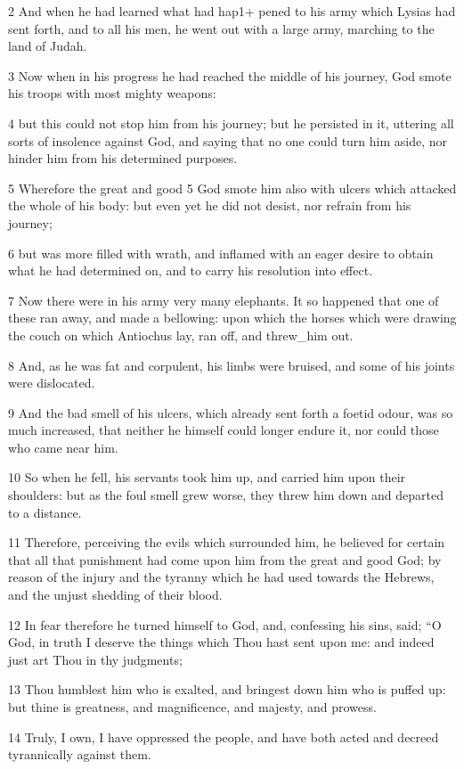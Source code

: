 2 And when he had learned what had hap1+ pened to his army which Lysias had sent forth, and to all his men, he went out with a large army, marching to the land of Judah. 

3 Now when in his progress he had reached the middle of his journey, God smote his troops with most mighty weapons: 

4 but this could not stop him from his journey; but he persisted in it, uttering all sorts of insolence against God, and saying that no one could turn him aside, nor hinder him from his determined purposes. 

5 Wherefore the great and good 5 God smote him also with ulcers which attacked the whole of his body: but even yet he did not desist, nor refrain from his journey; 

6 but was more filled with wrath, and inflamed with an eager desire to obtain what he had determined on, and to carry his resolution into effect. 

7 Now there were in his army very many elephants. It so happened that one of these ran away, and made a bellowing: upon which the horses which were drawing the couch on which Antiochus lay, ran off, and threw_him out. 

8 And, as he was fat and corpulent, his limbs were bruised, and some of his joints were dislocated. 

9 And the bad smell of his ulcers, which already sent forth a foetid odour, was so much increased, that neither he himself could longer endure it, nor could those who came near him. 

10 So when he fell, his servants took him up, and carried him upon their shoulders: but as the foul smell grew worse, they threw him down and departed to a distance. 

11 Therefore, perceiving the evils which surrounded him, he believed for certain that all that punishment had come upon him from the great and good God; by reason of the injury and the tyranny which he had used towards the Hebrews, and the unjust shedding of their blood. 

12 In fear therefore he turned himself to God, and, confessing his sins, said; “O God, in truth I deserve the things which Thou hast sent upon me: and indeed just art Thou in thy judgments; 

13 Thou humblest him who is exalted, and bringest down him who is puffed up: but thine is greatness, and magnificence, and majesty, and prowess. 

14 Truly, I own, I have oppressed the people, and have both acted and decreed tyrannically against them. 

